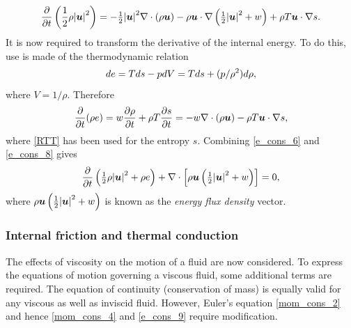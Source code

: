 \begin{equation}\label{e_cons_6}
 \frac{\partial}{\partial{t}}\left(\frac{1}{2}\rho{|{\mbox{\boldmath$u$}}|}^{2}\right)=-{\textstyle \frac{1}{2}}{|{\mbox{\boldmath$u$}}|}^{2}\nabla\cdot(\rho{\mbox{\boldmath$u$}})
                                                                 -\rho{\mbox{\boldmath$u$}}\cdot\nabla\left({\textstyle \frac{1}{2}}{|{\mbox{\boldmath$u$}}|}^{2}+w\right)
                                                                 +\rho{T}{\mbox{\boldmath$u$}}\cdot\nabla{s}.
\end{equation}
It is now required to transform the derivative of the internal energy. To do this, use is made of the thermodynamic relation
\begin{equation}\label{e_cons_7}
 de=Tds-pdV=Tds+(p/\rho^{2})d\rho,
\end{equation}
where $V=1/\rho$. Therefore 
\begin{equation}\label{e_cons_8}
 \frac{\partial}{\partial{t}}(\rho e)=w\frac{\partial\rho}{\partial{t}}+\rho{T}\frac{\partial{s}}{\partial{t}}
                                            =-w\nabla\cdot(\rho{\mbox{\boldmath$u$}})-\rho{T}{\mbox{\boldmath$u$}}\cdot\nabla{s},
\end{equation}
where \eqref{RTT} has been used for the entropy $s$. Combining \eqref{e_cons_6} and \eqref{e_cons_8} gives
\begin{equation}\label{e_cons_9}
 \frac{\partial}{\partial{t}}\left({\textstyle \frac{1}{2}}\rho{|{\mbox{\boldmath$u$}}|}^{2}+\rho e\right)+\nabla\cdot\left[\rho{\mbox{\boldmath$u$}}\left({\textstyle \frac{1}{2}}{|{\mbox{\boldmath$u$}}|}^{2}+w\right)\right]=0,
\end{equation}
where $\rho{\mbox{\boldmath$u$}}\left({\textstyle \frac{1}{2}}{|{\mbox{\boldmath$u$}}|}^{2}+w\right)$ is known as the \textit{energy flux density} vector.

\subsubsection{Internal friction and thermal conduction}\label{Sect:stressed}
The effects of viscosity on the motion of a fluid are now considered. To express the equations of motion governing a viscous fluid, some additional terms are required. The equation of continuity (conservation of mass) is equally valid for any viscous as well as inviscid fluid. However, Euler's equation \eqref{mom_cons_2} and hence \eqref{mom_cons_4} and \eqref{e_cons_9} require modification.

